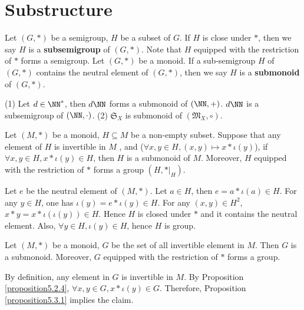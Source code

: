\section{Substructure}
\begin{definitionenv}
    Let $(G, *)$ be a semigroup,  $H$ be a subset of $G$. If $H$ is close under $*$,  then we say $H$ is a \textbf{subsemigroup} of $(G, *)$. Note that $H$ equipped with the restriction of $*$ forms a semigroup.
    Let $(G, *)$ be a monoid. If a sub-semigroup $H$ of $(G, *)$ contains the neutral element of $(G, *)$,  then we say $H$ is a \textbf{submonoid} of $(G, *)$.
\end{definitionenv}
\begin{exampleenv}
   \quad
   \newline
   (1) Let $d\in \NN^*$,  then $d\NN$ forms a submonoid of $(\NN, +)$.
   $d\NN$ is a subsemigroup of $(\NN, \cdot)$.
    \newline
    (2) $\mathfrak{S} _X$ is submonoid of $(\mathfrak{M} _X, \circ)$.
\end{exampleenv}
\begin{propositionenv}\label{proposition5.3.1}
    Let $(M, *)$ be a monoid,  $H\subseteq M$ be a non-empty subset. Suppose that any element of $H$ is invertible in $M$ ,  and ($\forall x, y \in H, (x, y)\mapsto x*\iota(y)$),  if $\forall x, y\in H,  x*\iota(y)\in H$,  then $H$ is a submonoid of $M$. Moreover,  $H$ equipped with the restriction of $*$ forms a group $(H, *|_H)$. 
\end{propositionenv}
\begin{proofenv}
    Let $e$ be the neutral element of $(M, *)$. Let $a\in H$,  then $e=a*\iota(a)\in H$. For any $y\in H$,  one has $\iota(y)=e*\iota(y)\in H$. For any $(x, y)\in H^2$,  $x*y=x*\iota(\iota(y))\in H$. Hence $H$ is closed under $*$ and it contains the neutral element. Also,  $\forall y\in H,  \iota(y)\in H$,  hence $H$ is group. 
\end{proofenv}
\begin{corollaryenv}
    Let $(M, *)$ be a monoid,  $G$ be the set of all invertible element in $M$. Then $G$ is a submonoid. Moreover,  $G$ equipped with the restriction of $*$ forms a group.
\end{corollaryenv}
\begin{proofenv}
    By definition,  any element in $G$ is invertible in $M$. By Proposition \ref{proposition5.2.4},  $\forall x, y\in G,  x*\iota(y)\in G$. Therefore,  Proposition \ref{proposition5.3.1} implies the claim.
\end{proofenv}
